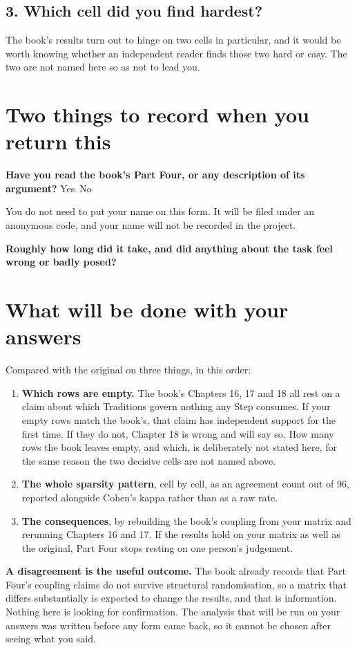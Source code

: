 \documentclass[11pt]{article}
\begin{document}
\subsection{3. Which cell did you find hardest?}
The book's results turn out to hinge on two cells in particular, and it would be worth knowing
whether an independent reader finds those two hard or easy. The two are not named here so as not
to lead you.
\answerlines[5]

\section{Two things to record when you return this}

\textbf{Have you read the book's Part Four, or any description of its argument?} \quad
Yes~\checkbox \qquad No~\checkbox

\smallskip
You do not need to put your name on this form. It will be filed under an anonymous code, and your
name will not be recorded in the project.

\smallskip
\textbf{Roughly how long did it take, and did anything about the task feel wrong or badly posed?}
\answerlines[4]

\section{What will be done with your answers}

Compared with the original on three things, in this order:

\begin{enumerate}[leftmargin=*,itemsep=3pt]
\item \textbf{Which rows are empty.} The book's Chapters 16, 17 and 18 all rest on a claim about
      which Traditions govern nothing any Step consumes. If your empty rows match the book's, that
      claim has independent support for the first time. If they do not, Chapter 18 is wrong and
      will say so. How many rows the book leaves empty, and which, is deliberately not stated
      here, for the same reason the two decisive cells are not named above.
\item \textbf{The whole sparsity pattern}, cell by cell, as an agreement count out of 96, reported
      alongside Cohen's kappa rather than as a raw rate.
\item \textbf{The consequences}, by rebuilding the book's coupling from your matrix and rerunning
      Chapters 16 and 17. If the results hold on your matrix as well as the original, Part Four
      stops resting on one person's judgement.
\end{enumerate}

\begin{note}
\textbf{A disagreement is the useful outcome.} The book already records that Part Four's coupling
claims do not survive structural randomisation, so a matrix that differs substantially is expected
to change the results, and that is information. Nothing here is looking for confirmation. The
analysis that will be run on your answers was written before any form came back, so it cannot be
chosen after seeing what you said.
\end{note}
\end{document}
